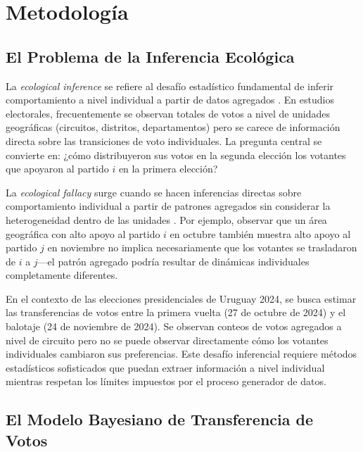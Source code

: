 
\section{Metodología}
\label{sec:metodologia}

\subsection{El Problema de la Inferencia Ecológica}

La \textit{ecological inference} se refiere al desafío estadístico fundamental de inferir comportamiento a nivel individual a partir de datos agregados \cite{king1997}. En estudios electorales, frecuentemente se observan totales de votos a nivel de unidades geográficas (circuitos, distritos, departamentos) pero se carece de información directa sobre las transiciones de voto individuales. La pregunta central se convierte en: ¿cómo distribuyeron sus votos en la segunda elección los votantes que apoyaron al partido $i$ en la primera elección?

La \textit{ecological fallacy} surge cuando se hacen inferencias directas sobre comportamiento individual a partir de patrones agregados sin considerar la heterogeneidad dentro de las unidades \cite{king1997}. Por ejemplo, observar que un área geográfica con alto apoyo al partido $i$ en octubre también muestra alto apoyo al partido $j$ en noviembre no implica necesariamente que los votantes se trasladaron de $i$ a $j$—el patrón agregado podría resultar de dinámicas individuales completamente diferentes.

En el contexto de las elecciones presidenciales de Uruguay 2024, se busca estimar las transferencias de votos entre la primera vuelta (27 de octubre de 2024) y el balotaje (24 de noviembre de 2024). Se observan conteos de votos agregados a nivel de circuito pero no se puede observar directamente cómo los votantes individuales cambiaron sus preferencias. Este desafío inferencial requiere métodos estadísticos sofisticados que puedan extraer información a nivel individual mientras respetan los límites impuestos por el proceso generador de datos.

\subsection{El Modelo Bayesiano de Transferencia de Votos}

